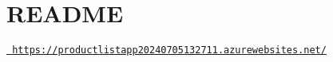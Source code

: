 \chapter{README}
\hypertarget{md__d_1_2_development_2_product_list_app_2_r_e_a_d_m_e}{}\label{md__d_1_2_development_2_product_list_app_2_r_e_a_d_m_e}
\href{https://productlistapp20240705132711.azurewebsites.net/}{\texttt{ https\+://productlistapp20240705132711.\+azurewebsites.\+net/}} 